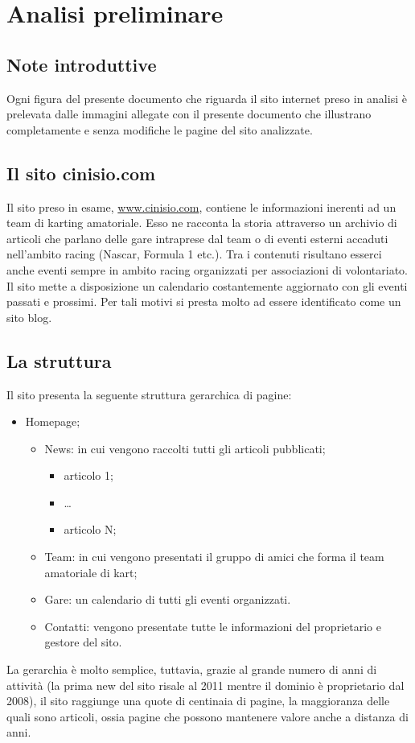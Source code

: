 
\section{Analisi preliminare}

	\subsection{Note introduttive}
		Ogni figura del presente documento che riguarda il sito internet preso in analisi è prelevata dalle immagini allegate con il presente documento che illustrano completamente e senza modifiche le pagine del sito analizzate.

	\subsection{Il sito cinisio.com}
		Il sito preso in esame, \href{http://www.cinisio.com/}{www.cinisio.com}, contiene le informazioni inerenti ad un team di karting amatoriale. Esso ne racconta la storia attraverso un archivio di articoli che parlano delle gare intraprese dal team o di eventi esterni accaduti nell'ambito racing (Nascar, Formula 1 etc.). Tra i contenuti risultano esserci anche eventi sempre in ambito racing organizzati per associazioni di volontariato. Il sito mette a disposizione un calendario costantemente aggiornato con gli eventi passati e prossimi. Per tali motivi si presta molto ad essere identificato come un sito blog.
		
	\subsection{La struttura}
		Il sito presenta la seguente struttura gerarchica di pagine:
		\begin{itemize}
			\item Homepage;
				\begin{itemize}
					\item News: in cui vengono raccolti tutti gli articoli pubblicati;
						\begin{itemize}
							\item articolo 1;
							\item \dots
							\item articolo N;
						\end{itemize}
					\item Team: in cui vengono presentati il gruppo di amici che forma il team amatoriale di kart;
					\item Gare: un calendario di tutti gli eventi organizzati.
					\item Contatti: vengono presentate tutte le informazioni del proprietario e gestore del sito.
				\end{itemize}
		\end{itemize}
		
		La gerarchia è molto semplice, tuttavia, grazie al grande numero di anni di attività (la prima new del sito risale al 2011 mentre il dominio è proprietario dal 2008), il sito raggiunge una quote di centinaia di pagine, la maggioranza delle quali sono articoli, ossia pagine che possono mantenere valore anche a distanza di anni.
		
		